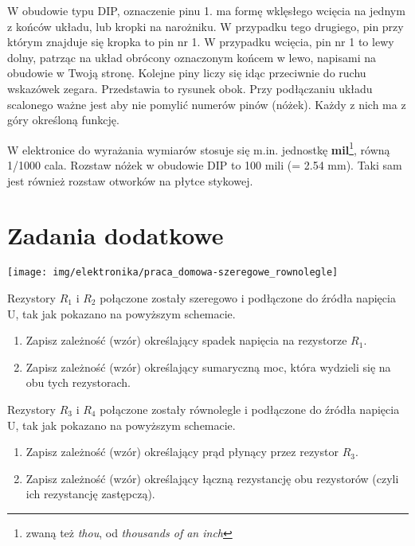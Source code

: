 \documentclass{pdfBooklets}
\begin{document}
W obudowie typu DIP, oznaczenie pinu 1. ma formę wklęsłego wcięcia na jednym z końców układu, lub kropki na narożniku. W przypadku tego drugiego, pin przy którym znajduje się kropka to pin nr 1. W przypadku wcięcia, pin nr 1 to lewy dolny, patrząc na układ obrócony oznaczonym końcem w lewo, napisami na obudowie w Twoją stronę. Kolejne piny liczy się idąc przeciwnie do ruchu wskazówek zegara. Przedstawia to rysunek obok.
Przy podłączaniu układu scalonego ważne jest aby nie pomylić numerów pinów (nóżek). Każdy z nich ma z góry określoną funkcję.

\begin{ProTip}{}
  W elektronice do wyrażania wymiarów stosuje się m.in. jednostkę \textbf{mil}\footnote{zwaną też \textit{thou}, od \textit{thousands of an inch}},
  równą 1/1000 cala. Rozstaw nóżek w obudowie DIP to 100 mili (= 2.54 mm). Taki sam jest również rozstaw otworków na płytce stykowej.
\end{ProTip}


\section{Zadania dodatkowe}

\vspace{13pt}
\begin{center}\texttt{[image: img/elektronika/praca\_domowa-szeregowe\_rownolegle]}\end{center}
\vspace{-7pt}

\begin{Zadanie}{}{}
  Rezystory $R_1$ i $R_2$ połączone zostały szeregowo i podłączone do źródła napięcia U, tak jak pokazano na powyższym schemacie.
  \begin{enumerate}[label=\alph*)]
    \item Zapisz zależność (wzór) określający spadek napięcia na rezystorze $R_1$.
    \item Zapisz zależność (wzór) określający sumaryczną moc, która wydzieli się na obu tych rezystorach.
  \end{enumerate}
\end{Zadanie}

\begin{Zadanie}{}{}
  Rezystory $R_3$ i $R_4$ połączone zostały równolegle i podłączone do źródła napięcia U, tak jak pokazano na powyższym schemacie.
  \begin{enumerate}[label=\alph*)]
    \item Zapisz zależność (wzór) określający prąd płynący przez rezystor $R_3$.
    \item Zapisz zależność (wzór) określający łączną rezystancję obu rezystorów (czyli ich rezystancję zastępczą).
  \end{enumerate}
\end{Zadanie}
\end{document}
